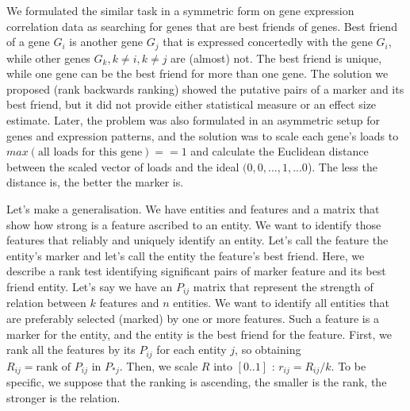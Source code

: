 \documentclass[12pt]{article}
\begin{document}
We formulated \cite{best_friends:2015} the similar task in a symmetric form on gene expression correlation data as searching for genes that are best friends of genes. Best friend of a gene $G_i$ is another gene $G_j$ that is expressed concertedly with the gene $G_i$, while other genes $G_k, k\neq i, k \neq j$ are (almost) not. The best friend is unique, while one gene can be the best friend for more than one gene. The solution we proposed (rank backwards ranking) showed the putative pairs of a marker and its best friend, but it did not provide either statistical measure or an effect size estimate. Later, the problem was also formulated in an asymmetric setup \cite{patternmarkers:2017} for genes and expression patterns, and the solution was to scale each gene's loads to $max(\mbox{all loads for this gene})==1$ and calculate the Euclidean distance between the scaled vector of loads and the ideal $(0,0,...,1,...0$). The less the distance is, the better the marker is. 

Let's make a generalisation. We have entities and features and a matrix that show how strong is a feature ascribed to an entity. We want to identify those features that reliably and uniquely identify an entity. Let's call the feature the entity's marker and let's call the entity the feature's best friend. Here, we describe a rank test identifying significant pairs of marker feature and its best friend entity.
%
Let's say we have an $P_{ij}$ matrix that represent the strength of relation between $k$ features and $n$ entities. We want to identify all entities that are preferably selected (marked) by one or more features. Such a feature is a marker for the entity, and the entity is the best friend for the feature.
First, we rank all the features by its $P_{ij}$ for each entity $j$, so obtaining $R_{ij}= \textrm{rank of } P_{ij} \textrm{ in } P_{*j}$. Then, we scale $R$ into $[0..1]$ : $r_{ij}={R_{ij}}/{k}$. To be specific, we suppose that the ranking is ascending, the smaller is the rank, the stronger is the relation.
\end{document}
